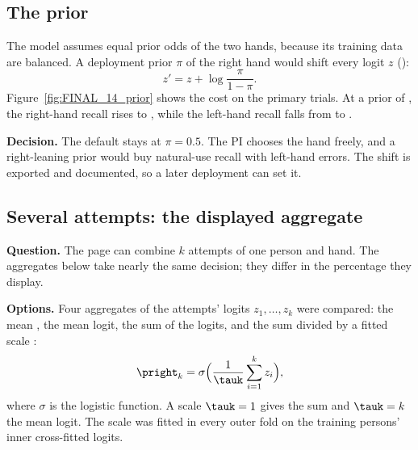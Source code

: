 
\subsection{The prior}\label{app:final:prior}

The model assumes equal prior odds of the two hands, because its training data are balanced.
A deployment prior $\pi$ of the right hand would shift every logit $z$ ():
\begin{equation}\label{eq:app-final-prior}
  z' = z + \log\frac{\pi}{1-\pi}.
\end{equation}
Figure~\ref{fig:FINAL_14_prior} shows the cost on the primary trials.
At a prior of , the right-hand recall rises to , while the left-hand recall falls from  to .

\textbf{Decision.}
The default stays at $\pi = 0.5$.
The PI chooses the hand freely, and a right-leaning prior would buy natural-use recall with left-hand errors.
The shift is exported and documented, so a later deployment can set it.

\subsection{Several attempts: the displayed aggregate}\label{app:final:attempts}

\textbf{Question.}
The page can combine $k$ attempts of one person and hand.
The aggregates below take nearly the same decision; they differ in the percentage they display.

\textbf{Options.}
Four aggregates of the attempts' logits $z_1, \dots, z_k$ were compared: the mean \pright{}, the mean logit, the sum of the logits, and the sum divided by a fitted scale \tauk:
\begin{equation}\label{eq:app-final-aggregate}
  \pright_k = \sigma\Big(\frac{1}{\tauk}\sum_{i=1}^{k} z_i\Big),
\end{equation}
where $\sigma$ is the logistic function.
A scale $\tauk = 1$ gives the sum and $\tauk = k$ the mean logit.
The scale \tauk{} was fitted in every outer fold on the training persons' inner cross-fitted logits.


